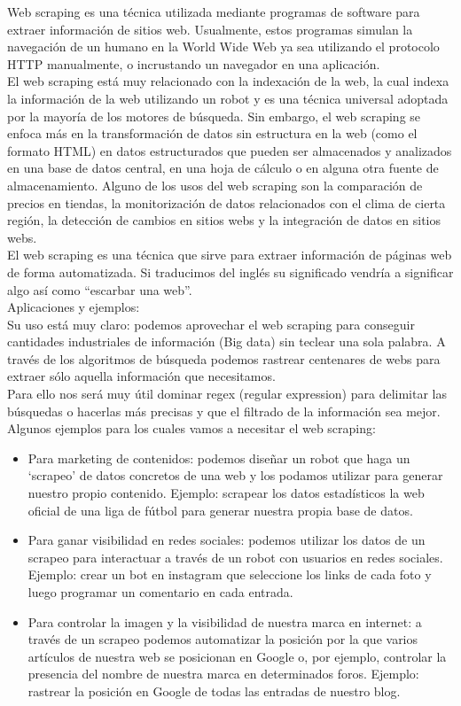 \begin{itemize}
			Web scraping es una técnica utilizada mediante programas de software para extraer información de sitios web. Usualmente, estos programas simulan la navegación de un humano en la World Wide Web ya sea utilizando el protocolo HTTP manualmente, o incrustando un navegador en una aplicación.  \\
			El web scraping está muy relacionado con la indexación de la web, la cual indexa la información de la web utilizando un robot y es una técnica universal adoptada por la mayoría de los motores de búsqueda. Sin embargo, el web scraping se enfoca más en la transformación de datos sin estructura en la web (como el formato HTML) en datos estructurados que pueden ser almacenados y analizados en una base de datos central, en una hoja de cálculo o en alguna otra fuente de almacenamiento. Alguno de los usos del web scraping son la comparación de precios en tiendas, la monitorización de datos relacionados con el clima de cierta región, la detección de cambios en sitios webs y la integración de datos en sitios webs.	\cite{araña} \\
			
			El web scraping es una técnica que sirve para extraer información de páginas web de forma automatizada. Si traducimos del inglés su significado vendría a significar algo así como “escarbar una web”. \\
			Aplicaciones y ejemplos:\\
			Su uso está muy claro: podemos aprovechar el web scraping para conseguir cantidades industriales de información (Big data) sin teclear una sola palabra. A través de los algoritmos de búsqueda podemos rastrear centenares de webs para extraer sólo aquella información que necesitamos.\\
			Para ello nos será muy útil dominar regex (regular expression) para delimitar las búsquedas o hacerlas más precisas y que el filtrado de la información sea mejor.\\
			Algunos ejemplos para los cuales vamos a necesitar el web scraping:
			\begin{itemize}
				\item Para marketing de contenidos: podemos diseñar un robot que haga un ‘scrapeo’ de datos concretos de una web y los podamos utilizar para generar nuestro propio contenido. Ejemplo: scrapear los datos estadísticos la web oficial de una liga de fútbol para generar nuestra propia base de datos.
				\item Para ganar visibilidad en redes sociales: podemos utilizar los datos de un scrapeo para interactuar a través de un robot con usuarios en redes sociales. Ejemplo: crear un bot en instagram que seleccione los links de cada foto y luego programar un comentario en cada entrada.
				\item Para controlar la imagen y la visibilidad de nuestra marca en internet: a través de un scrapeo podemos automatizar la posición por la que varios artículos de nuestra web se posicionan en Google o, por ejemplo, controlar la presencia del nombre de nuestra marca en determinados foros. Ejemplo: rastrear la posición en Google de todas las entradas de nuestro blog.
			\end{itemize}	
			

\end{itemize}
